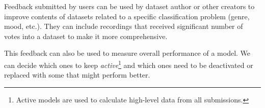 Feedback submitted by users can be used by dataset author or other creators to improve contents of datasets related to a specific classification problem (genre, mood, etc.). They can include recordings that received significant number of votes into a dataset to make it more comprehensive.

This feedback can also be used to measure overall performance of a model. We can decide which ones to keep \emph{active}\footnote{Active models are used to calculate high-level data from all submissions.} and which ones need to be deactivated or replaced with some that might perform better.
